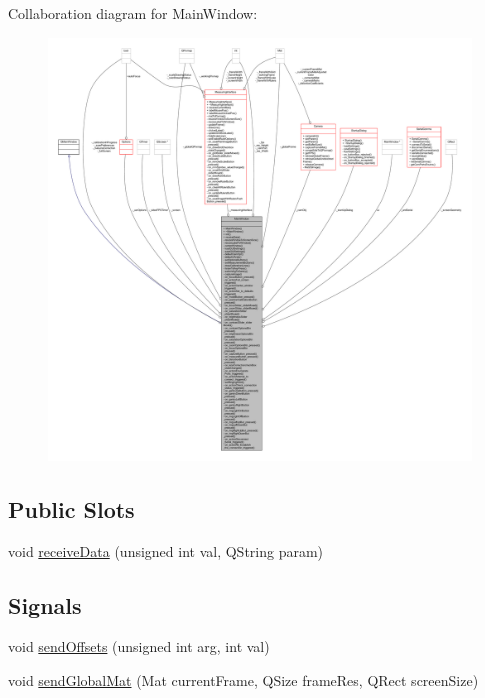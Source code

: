 Collaboration diagram for Main\+Window\+:
\nopagebreak
\begin{figure}[H]
\begin{center}
\leavevmode
\includegraphics[width=350pt]{class_main_window__coll__graph}
\end{center}
\end{figure}
\subsection*{Public Slots}
\begin{DoxyCompactItemize}
\item 
void \mbox{\hyperlink{class_main_window_ac7fa2374f28a46ed205758559114d79f}{receive\+Data}} (unsigned int val, Q\+String param)
\end{DoxyCompactItemize}
\subsection*{Signals}
\begin{DoxyCompactItemize}
\item 
void \mbox{\hyperlink{class_main_window_ab46a8e562fc57b9581b90328e0872a67}{send\+Offsets}} (unsigned int arg, int val)
\item 
void \mbox{\hyperlink{class_main_window_a302481f26ce2f1666e4a4dfaddacb08e}{send\+Global\+Mat}} (Mat current\+Frame, Q\+Size frame\+Res, Q\+Rect screen\+Size)
\end{DoxyCompactItemize}
